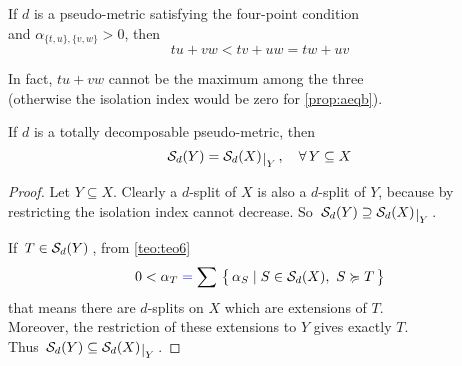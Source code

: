 \documentclass[./main.tex]{subfiles}
\begin{document}
\begin{remark}
    If $d$ is a pseudo-metric satisfying the four-point condition \\
    \bsp and $\alpha_{\{t,u\},\{v,w\}} > 0$, then
    \[ tu + vw < tv + uw = tw + uv \]

    In fact, $tu + vw$ cannot be the maximum among the three \\
    (otherwise the isolation index would be zero for \autoref{prop:aeqb}).
\end{remark}

\begin{proposition} \label{prop:SYeqSX}
    If $d$ is a totally decomposable pseudo-metric, then
    \[ \Sc_d(Y) = \restr{\Sc_d(X)}{Y} \,, \quad \forall\, Y \subseteq X \nospblw \]
\end{proposition}
\begin{proof}
    Let $Y \subseteq X$. Clearly a $d$-split of $X$ is also a $d$-split of $Y$, because by restricting the isolation index cannot decrease. So $\, \Sc_d(Y) \supseteq \restr{\Sc_d(X)}{Y} \,$.

    If $\, T \in {\mathcal{S}}_d(Y) \,$, from \autoref{teo:teo6}
    \[ 0 < \alpha_T \mathcolor{blue}{=} \sum\ \bigl\{\, \alpha_S \mid S \in \Sc_d(X),\ S \succcurlyeq T \,\bigr\} \]
    that means there are $d$-splits on $X$ which are extensions of $T$. \\
    Moreover, the restriction of these extensions to $Y$ gives exactly $T$. \\[3pt]
    Thus $\, \Sc_d(Y) \subseteq \restr{\Sc_d(X)}{Y} \,$. \qedhere
\end{proof} \bigskip
\end{document}
